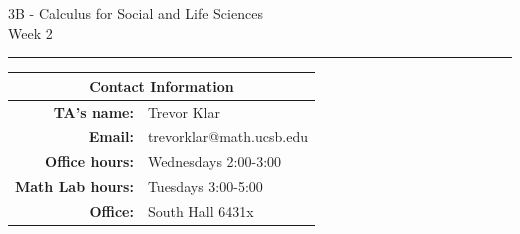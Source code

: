 \documentclass[12pt,letterpaper]{article}
\begin{document}
\thispagestyle{fancy}
\begin{center}
3B - Calculus for Social and Life Sciences\\
Week 2 %
\end{center}

\hrule

\begin{center}
\begin{tabular}{|rl|}
\hline
\multicolumn{2}{|c|}{Contact Information} \\
\hline
\bf{TA's name:} & Trevor Klar \\
\bf{Email:} & trevorklar@math.ucsb.edu \\
\bf{Office hours:} & Wednesdays 2:00-3:00 \\
\bf{Math Lab hours:} & Tuesdays 3:00-5:00 \\
\bf{Office:} & South Hall 6431x \\
\hline
\end{tabular}
\end{center}


\bigskip
\end{document}
